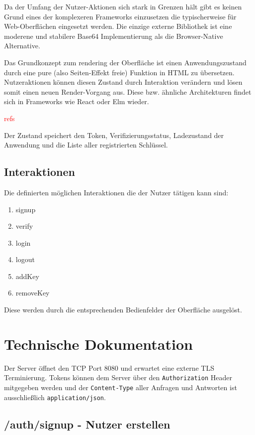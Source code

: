 \documentclass[journal]{IEEEtran}
\begin{document}
Da der Umfang der Nutzer-Aktionen sich stark in Grenzen hält gibt es keinen
Grund eines der komplexeren Frameworks einzusetzen die typischerweise für
Web-Oberflächen eingesetzt werden. Die einzige externe Bibliothek ist eine
moderene und stabilere Base64 Implementierung als die Browser-Native
Alternative.

Das Grundkonzept zum rendering der Oberfläche ist einen Anwendungszustand durch
eine pure (also Seiten-Effekt freie) Funktion in HTML zu übersetzen.
Nutzeraktionen können diesen Zustand durch Interaktion verändern und lösen
somit einen neuen Render-Vorgang aus. Diese bzw. ähnliche Architekturen findet
sich in Frameworks wie React oder Elm wieder.

\textcolor{red}{refs}

Der Zustand speichert den Token, Verifizierungsstatus, Ladezustand der
Anwendung und die Liste aller registrierten Schlüssel.

\subsection{Interaktionen}

Die definierten möglichen Interaktionen die der Nutzer tätigen kann sind:

\begin{enumerate}
	\item signup
	\item verify
	\item login
	\item logout
	\item addKey
	\item removeKey
\end{enumerate}

Diese werden durch die entsprechenden Bedienfelder der Oberfläche ausgelöst.


\section{Technische Dokumentation}\label{docs}

Der Server öffnet den TCP Port 8080 und erwartet eine externe TLS
Terminierung. Tokens können dem Server über den \texttt{Authorization} Header
mitgegeben werden und der \texttt{Content-Type} aller Anfragen und Antworten
ist ausschließlich \texttt{application/json}.

\subsection{/auth/signup - Nutzer erstellen}
\end{document}
